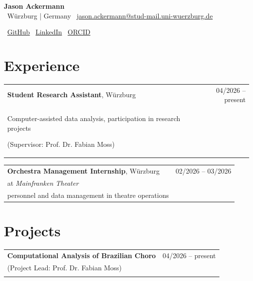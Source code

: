 \documentclass[11pt,a4paper]{article}
\begin{document}
\begin{center}
    {\LARGE \textbf{Jason Ackermann}}\\[0.6em]

    \faMapMarker*~Würzburg | Germany
    \quad
    \faEnvelope~\href{mailto:jason.ackermann@stud-mail.uni-wuerzburg.de}{jason.ackermann@stud-mail.uni-wuerzburg.de}
    \quad

    \faGithub~\href{https://github.com/jasonvla}{GitHub}
    \quad
    \faLinkedin~\href{https://www.linkedin.com/in/jason-ackermann-b9b316285/}{LinkedIn}
    \faOrcid~\href{https://orcid.org/0009-0000-2351-1071}{ORCID}
\end{center}
\section{Experience}

\begin{tabularx}{\textwidth}{X r}
\textbf{Student Research Assistant}, Würzburg & 04/2026 -- present\\
Computer-assisted data analysis, participation in research projects 

(Supervisor: Prof. Dr. Fabian Moss) & \\
\end{tabularx}

\begin{tabularx}{\textwidth}{X r}
\textbf{Orchestra Management Internship}, Würzburg & 02/2026 -- 03/2026\\
at \textit{Mainfranken Theater}  \\
personnel and data management in theatre operations & \\
\end{tabularx}

\section{Projects}

\begin{tabularx}{\textwidth}{X r}
\textbf{Computational Analysis of Brazilian Choro} & 04/2026 -- present \\
(Project Lead: Prof. Dr. Fabian Moss) & \\\\
\end{tabularx}
\end{document}
